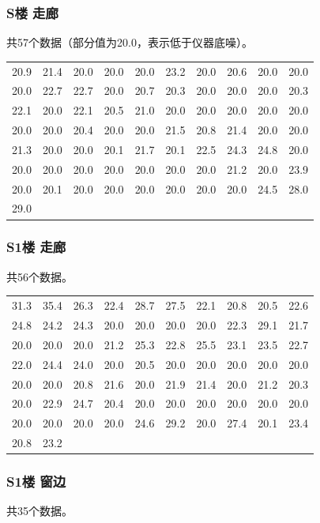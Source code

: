 \documentclass{../ElectromagneticFieldTemplate}
\begin{document}
\subsubsection{S楼 走廊}
共57个数据（部分值为20.0，表示低于仪器底噪）。

\begin{longtable}[c]{*{10}{c}}
20.9 & 21.4 & 20.0 & 20.0 & 20.0 & 23.2 & 20.0 & 20.6 & 20.0 & 20.0 \\
20.0 & 22.7 & 22.7 & 20.0 & 20.7 & 20.3 & 20.0 & 20.0 & 20.0 & 20.3 \\
22.1 & 20.0 & 22.1 & 20.5 & 21.0 & 20.0 & 20.0 & 20.0 & 20.0 & 20.0 \\
20.0 & 20.0 & 20.4 & 20.0 & 20.0 & 21.5 & 20.8 & 21.4 & 20.0 & 20.0 \\
21.3 & 20.0 & 20.0 & 20.1 & 21.7 & 20.1 & 22.5 & 24.3 & 24.8 & 20.0 \\
20.0 & 20.0 & 20.0 & 20.0 & 20.0 & 20.0 & 20.0 & 21.2 & 20.0 & 23.9 \\
20.0 & 20.1 & 20.0 & 20.0 & 20.0 & 20.0 & 20.0 & 20.0 & 24.5 & 28.0 \\
29.0 & & & & & & & & & \\
\end{longtable}

\subsubsection{S1楼 走廊}
共56个数据。

\begin{longtable}[c]{*{10}{c}}
31.3 & 35.4 & 26.3 & 22.4 & 28.7 & 27.5 & 22.1 & 20.8 & 20.5 & 22.6 \\
24.8 & 24.2 & 24.3 & 20.0 & 20.0 & 20.0 & 20.0 & 22.3 & 29.1 & 21.7 \\
20.0 & 20.0 & 20.0 & 21.2 & 25.3 & 22.8 & 25.5 & 23.1 & 23.5 & 22.7 \\
22.0 & 24.4 & 24.0 & 20.0 & 20.5 & 20.0 & 20.0 & 20.0 & 20.0 & 20.0 \\
20.0 & 20.0 & 20.8 & 21.6 & 20.0 & 21.9 & 21.4 & 20.0 & 21.2 & 20.3 \\
20.0 & 22.9 & 24.7 & 20.4 & 20.0 & 20.0 & 20.0 & 20.0 & 20.0 & 20.0 \\
20.0 & 20.0 & 20.0 & 20.0 & 24.6 & 29.2 & 20.0 & 27.4 & 20.1 & 23.4 \\
20.8 & 23.2 & & & & & & & & \\
\end{longtable}

\subsubsection{S1楼 窗边}
共35个数据。
\end{document}
